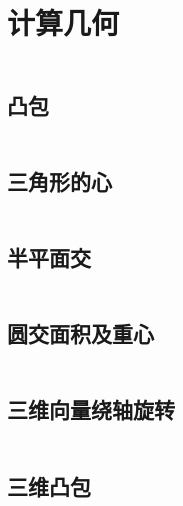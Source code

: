 \chapter{计算几何}

\inputminted{cpp}{\source/computational-geometry/2d/basis.cpp}
\section{凸包}
\inputminted{cpp}{\source/computational-geometry/2d/convex.cpp}
\section{三角形的心}
\inputminted{cpp}{\source/computational-geometry/2d/triangle.cpp}
\section{半平面交}
\inputminted{cpp}{\source/computational-geometry/2d/half-plane-intersection.cpp}
\section{圆交面积及重心}
\inputminted{cpp}{\source/computational-geometry/2d/circles-intersections.cpp}

\section{三维向量绕轴旋转}
\inputminted{cpp}{\source/computational-geometry/3d/basis.cpp}
\section{三维凸包}
\inputminted{cpp}{\source/computational-geometry/3d/convex.cpp}
